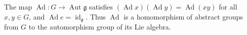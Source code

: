 The map $\operatorname{Ad}: G \to \operatorname{Aut} \mathfrak{g}$ satisfies $(\operatorname{Ad} x)(\operatorname{Ad} y) = \operatorname{Ad}(xy)$ for all $x, y \in G$, and $\operatorname{Ad} e = \operatorname{id}_{\mathfrak{g}}$. Thus $\operatorname{Ad}$ is a homomorphism of abstract groups from $G$ to the automorphism group of its Lie algebra.

